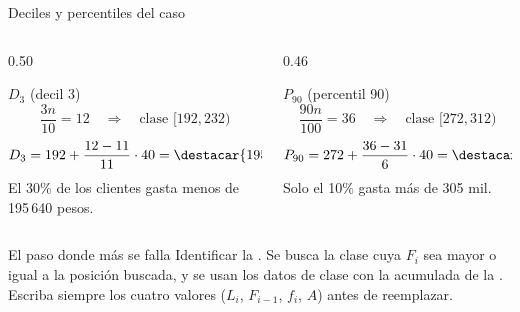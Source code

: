 \documentclass[aspectratio=169,10pt]{beamer}
\begin{document}
\begin{frame}{Deciles y percentiles del caso}
  \scriptsize
  \begin{columns}[T,onlytextwidth]
    \begin{column}{0.50\textwidth}
      \begin{exampleblock}{$D_3$ (decil 3)}
        \scriptsize
        \[ \frac{3n}{10} = 12 \quad\Rightarrow\quad \text{clase } [192,232) \]
        \[ D_3 = 192 + \frac{12-11}{11}\cdot 40 = \destacar{195{,}64} \]
        El 30\% de los clientes gasta menos de 195\,640 pesos.
      \end{exampleblock}
    \end{column}
    \begin{column}{0.46\textwidth}
      \begin{exampleblock}{$P_{90}$ (percentil 90)}
        \scriptsize
        \[ \frac{90n}{100} = 36 \quad\Rightarrow\quad \text{clase } [272,312) \]
        \[ P_{90} = 272 + \frac{36-31}{6}\cdot 40 = \destacar{305{,}33} \]
        Solo el 10\% gasta más de 305 mil.
      \end{exampleblock}
    \end{column}
  \end{columns}

  \vspace{0.1cm}
  \begin{alertblock}{El paso donde más se falla}
    \scriptsize
    Identificar la . Se busca la  clase
    cuya $F_i$ sea mayor o igual a la posición buscada, y se usan los datos de
     clase con la acumulada de la . Escriba siempre
    los cuatro valores ($L_i$, $F_{i-1}$, $f_i$, $A$) antes de reemplazar.
  \end{alertblock}
\end{frame}
\end{document}
